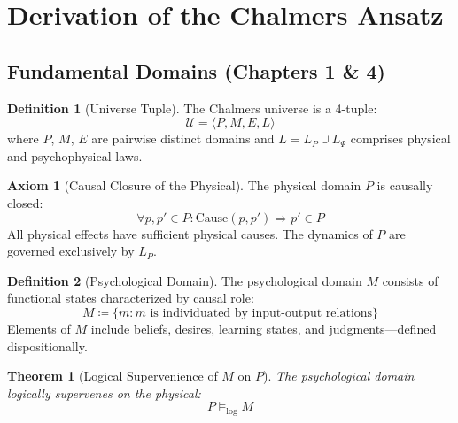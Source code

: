 \documentclass[11pt,a4paper]{article}
\theoremstyle{definition}
\newtheorem{definition}{Definition}[section]
\newtheorem{axiom}{Axiom}[section]
\theoremstyle{plain}
\newtheorem{theorem}{Theorem}[section]
\theoremstyle{remark}
\newcommand{\logent}{\vDash_{\text{log}}}
\begin{document}
\newpage

\section{Derivation of the Chalmers Ansatz}

\subsection{Fundamental Domains (Chapters 1 \& 4)}

\begin{definition}[Universe Tuple]
The Chalmers universe is a 4-tuple:
\begin{equation}
\boxed{\mathcal{U} = \langle P, M, E, L \rangle}
\end{equation}
where $P$, $M$, $E$ are pairwise distinct domains and $L = L_P \cup L_\Psi$ comprises physical and psychophysical laws.
\end{definition}

\begin{axiom}[Causal Closure of the Physical]\label{ax:causal_closure}
The physical domain $P$ is causally closed:
\begin{equation}
\forall p, p' \in P: \text{Cause}(p, p') \Rightarrow p' \in P
\end{equation}
All physical effects have sufficient physical causes. The dynamics of $P$ are governed exclusively by $L_P$.
\end{axiom}

\begin{definition}[Psychological Domain]
The psychological domain $M$ consists of functional states characterized by causal role:
\begin{equation}
M \coloneqq \{ m : m \text{ is individuated by input-output relations} \}
\end{equation}
Elements of $M$ include beliefs, desires, learning states, and judgments---defined dispositionally.
\end{definition}

\begin{theorem}[Logical Supervenience of $M$ on $P$]\label{thm:M_supervenes}
The psychological domain logically supervenes on the physical:
\begin{equation}
\boxed{P \logent M}
\end{equation}
\end{theorem}
\end{document}
